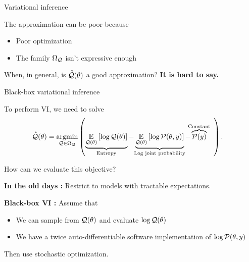 \documentclass[8pt]{beamer}\usepackage[]{graphicx}\usepackage[]{color}
\begin{document}
\begin{frame}[t]{Variational inference \citep{blei:2016:variational}}
\begin{minipage}{0.55\textwidth}
The approximation can be poor because
%
\begin{itemize}
\item Poor optimization
\item The family $\Omega_{\mathcal{Q}}$ isn't expressive enough
\end{itemize}
%

%
\end{minipage}

When, in general, is $\accentset{*}{\mathcal{Q}}(\theta)$ a good approximation?  \textbf{It is hard to say.}

\end{frame}




\begin{frame}[t]{Black-box variational inference}

To perform VI, we need to solve
%
\begin{align*}
%
\qstar(\theta) &= \argmin_{\q \in \qdom} \left( 
\undernote{
    \expect{\q(\theta)}{\log \q(\theta)}
    }{\textrm{Entropy}} - 
\undernote{
    \expect{\q(\theta)}{\log \p(\theta, \y)}
}{\textrm{Log joint probability}}
 - \overnote{\p(\y)}{\textrm{Constant}}
\quad\right).
%
\end{align*}
    
How can we evaluate this objective?

\vspace{3em}
\textbf{In the old days \citep{bishop:2006:pattern}: }Restrict to models with tractable expectations.

\vspace{3em}
\textbf{Black-box VI \citep{ranganath:2014:bbvi}: }  Assume that 
%
\begin{itemize}
    \item We can sample from $\mathcal{Q}(\theta)$ and evaluate $\log \mathcal{Q}(\theta)$
    \item We have a twice auto-differentiable software implementation of $\log \mathcal{P}(\theta, y)$
\end{itemize}
%
Then use stochastic optimization.

\end{frame}



    
\end{document}
